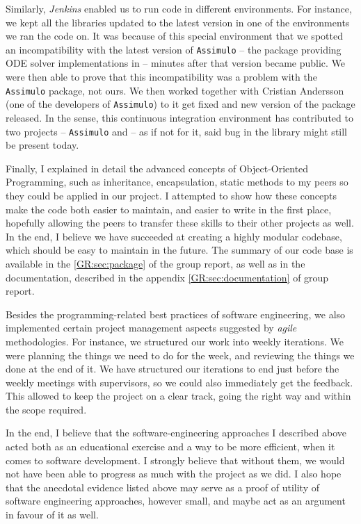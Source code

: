 Similarly, \emph{Jenkins} enabled us to run code in different environments. For instance, we kept all the libraries updated to the latest version in one of the environments we ran the code on. 
It was because of this special environment that we spotted an incompatibility with the latest version of \verb"Assimulo"\cite{andersson_christian_assimulo:_????} -- the package providing ODE solver implementations in \py{} -- minutes after that version became public. We were then able to prove that this incompatibility was a problem with the \verb"Assimulo" package, not ours. 
We then worked together with Cristian Andersson (one of the developers of \verb"Assimulo") to it get fixed and new version of the package released.
In the sense, this continuous integration environment has contributed to two projects -- \verb"Assimulo" and \means{} -- as if not for it, said bug in the library might still be present today.

Finally, I explained in detail the advanced concepts of Object-Oriented Programming, such as inheritance, encapsulation, static methods to my peers so they could be applied in our project.
I attempted to show how these concepts make the code both easier to maintain, and easier to write in the first place, hopefully allowing the peers to transfer these skills to their other projects as well.
In the end, I believe we have succeeded at creating a highly modular codebase, which should be easy to maintain in the future. The summary of our code base is available in the \autoref*{GR:sec:package} of the group report, as well as in the documentation, described in the appendix \autoref*{GR:sec:documentation} of group report.

Besides the programming-related best practices of software engineering, we also implemented certain project management aspects suggested by \emph{agile} methodologies. 
For instance, we structured our work into weekly iterations. We were planning the things we need to do for the week, and reviewing the things we done at the end of it. 
We have structured our iterations to end just before the weekly meetings with supervisors, so we could also immediately get the feedback.
This allowed to keep the project on a clear track, going the right way and within the scope required.

In the end, I believe that the software-engineering approaches I described above acted both as an educational exercise and a way to be more efficient, when it comes to software development.
I strongly believe that without them, we would not have been able to progress as much with the project as we did.
I also hope that the anecdotal evidence listed above may serve as a proof of utility of software engineering approaches, however small, and maybe act as an argument in favour of it as well.

